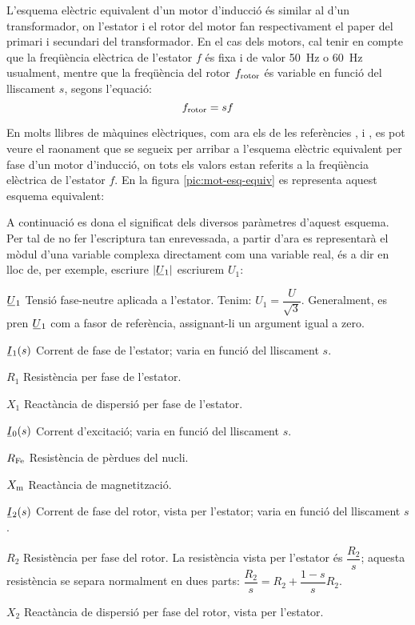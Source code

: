 L'esquema elèctric equivalent d'un motor d'inducció és similar al d'un transformador, on l'estator i el rotor del motor fan respectivament el paper del primari i  secundari del transformador. En el cas dels motors, cal tenir en compte que la freqüència elèctrica de l'estator $f$ és fixa i de valor \qty{50}{Hz} o \qty{60}{Hz} usualment, mentre que la freqüència del rotor $f_\mathrm{rotor}$ és variable en funció del lliscament $s$, segons l'equació:
\begin{equation}
    f_\mathrm{rotor} = s f
\end{equation}

En molts llibres de màquines elèctriques, com ara els de les referències \cite{CHA}, \cite{FIT} i \cite{JFM}, es pot veure el raonament que se segueix per arribar a l'esquema elèctric equivalent per fase d'un motor d'inducció, on tots els valors estan referits a la freqüència elèctrica de l'estator $f$. En la figura \vref{pic:mot-esq-equiv} es representa aquest esquema equivalent:

\begin{center}
    
    \label{pic:mot-esq-equiv}
\end{center}

A continuació es dona el significat dels diversos paràmetres d'aquest esquema. Per tal de no fer l'escriptura tan enrevessada, a partir d'ara es representarà el mòdul d'una variable complexa  directament com una variable real, és a dir en lloc de, per exemple, escriure $|\cmplx{U}_1|$ escriurem $U_1$:

\begin{list}{}
   {\setlength{\labelwidth}{10mm} \setlength{\leftmargin}{15mm} \setlength{\labelsep}{5mm}}
   \item[$\cmplx{U}_1$] Tensió fase-neutre aplicada a l'estator. Tenim: $U_1 = \dfrac{U}{\sqrt{3}}$. Generalment,   es pren $\cmplx{U}_1$ com a fasor de referència, assignant-li un argument igual a zero.
   \item[$\cmplx{I}_1(s)$] Corrent de fase de l'estator; varia en funció del lliscament $s$.
   \item[$R_1$] Resistència per fase de l'estator.
   \item[$X_1$] Reactància de dispersió per fase de l'estator.
   \item[$\cmplx{I}_0(s)$] Corrent d'excitació; varia en funció del lliscament $s$.
   \item[$R_\mathrm{Fe}$] Resistència de pèrdues del nucli.
   \item[$X_\mathrm{m}$] Reactància de magnetització.
   \item[$\cmplx{I}_2(s)$] Corrent de fase del rotor, vista per l'estator; varia en funció del lliscament $s$.
   \item[$R_2$] Resistència per fase del rotor. La resistència vista per l'estator és $\dfrac{R_2}{s}$; aquesta resistència  se separa normalment en dues parts: $\dfrac{R_2}{s} = R_2 + \dfrac{1-s}{s} R_2$.
   \item[$X_2$] Reactància de dispersió per fase del rotor, vista per l'estator.
\end{list}

